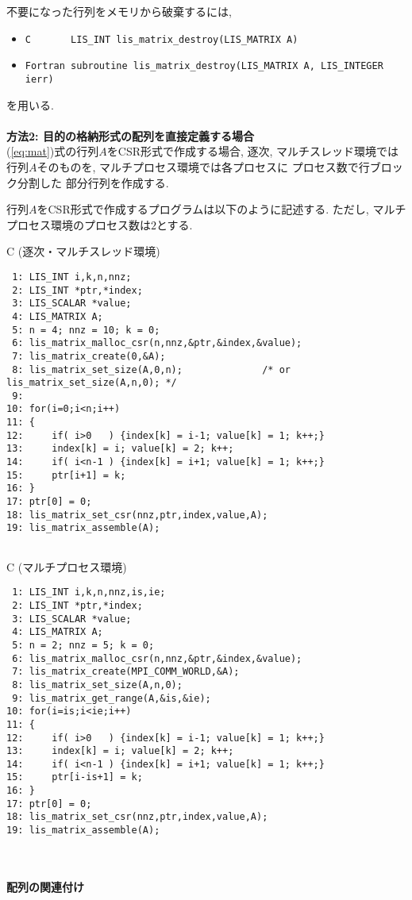 \documentclass[a4paper]{jarticle}
\begin{document}
{{不要になった行列をメモリから破棄するには, 
\begin{itemize}
\item \verb|C       LIS_INT lis_matrix_destroy(LIS_MATRIX A)|
\item \verb|Fortran subroutine lis_matrix_destroy(LIS_MATRIX A, LIS_INTEGER ierr)|
\end{itemize}
を用いる. 
\\ \\
{\bf 方法2: 目的の格納形式の配列を直接定義する場合}\\
(\ref{eq:mat})式の行列$A$をCSR形式で作成する場合, 
逐次, マルチスレッド環境では行列$A$そのものを, マルチプロセス環境では各プロセスに
プロセス数で行ブロック分割した
部分行列を作成する. 

行列$A$をCSR形式で作成するプログラムは以下のように記述する. 
ただし, マルチプロセス環境のプロセス数は$2$とする. 
\begin{itembox}[l]{C (逐次・マルチスレッド環境)}
\small
\begin{verbatim}
 1: LIS_INT i,k,n,nnz;
 2: LIS_INT *ptr,*index;
 3: LIS_SCALAR *value;
 4: LIS_MATRIX A;
 5: n = 4; nnz = 10; k = 0;
 6: lis_matrix_malloc_csr(n,nnz,&ptr,&index,&value);
 7: lis_matrix_create(0,&A);
 8: lis_matrix_set_size(A,0,n);              /* or lis_matrix_set_size(A,n,0); */ 
 9: 
10: for(i=0;i<n;i++)
11: {
12:     if( i>0   ) {index[k] = i-1; value[k] = 1; k++;}
13:     index[k] = i; value[k] = 2; k++;
14:     if( i<n-1 ) {index[k] = i+1; value[k] = 1; k++;}
15:     ptr[i+1] = k;
16: }
17: ptr[0] = 0;
18: lis_matrix_set_csr(nnz,ptr,index,value,A);
19: lis_matrix_assemble(A); 


\end{verbatim}
\end{itembox}
\begin{itembox}[l]{C (マルチプロセス環境)}
\small
\begin{verbatim}
 1: LIS_INT i,k,n,nnz,is,ie;
 2: LIS_INT *ptr,*index;
 3: LIS_SCALAR *value;
 4: LIS_MATRIX A;
 5: n = 2; nnz = 5; k = 0;
 6: lis_matrix_malloc_csr(n,nnz,&ptr,&index,&value);
 7: lis_matrix_create(MPI_COMM_WORLD,&A);
 8: lis_matrix_set_size(A,n,0);
 9: lis_matrix_get_range(A,&is,&ie);
10: for(i=is;i<ie;i++)
11: {
12:     if( i>0   ) {index[k] = i-1; value[k] = 1; k++;}
13:     index[k] = i; value[k] = 2; k++;
14:     if( i<n-1 ) {index[k] = i+1; value[k] = 1; k++;}
15:     ptr[i-is+1] = k;
16: }
17: ptr[0] = 0;
18: lis_matrix_set_csr(nnz,ptr,index,value,A);
19: lis_matrix_assemble(A); 
\end{verbatim}
\end{itembox}
\\ \\
\noindent
{\bf 配列の関連付け}

}}
\end{document}
